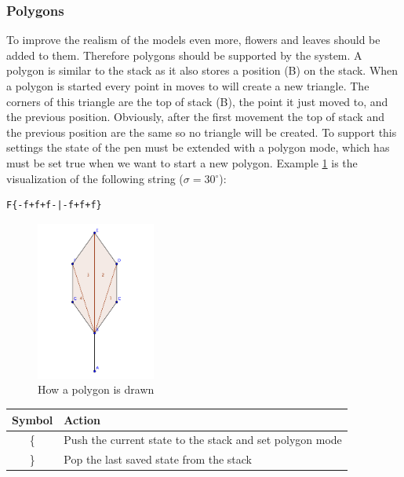\documentclass[11pt,a4paper]{article}
\newcommand{\degree}{\ensuremath{^\circ}}
\begin{document}
\subsubsection{Polygons}
To improve the realism of the models even more, flowers and leaves should be added to them. Therefore polygons should be supported by the system. A polygon is similar to the stack as it also stores a position (B) on the stack. When a polygon is started every point in moves to will create a new triangle. The corners of this triangle are the top of stack (B), the point it just moved to, and the previous position. Obviously, after the first movement the top of stack and the previous position are the same so no triangle will be created. To support this settings the state of the pen must be extended with a polygon mode, which has must be set true when we want to start a new polygon. Example \ref{fig:polygon} is the visualization of the following string ($\sigma = 30\degree$):
\begin{verbatim}
F{-f+f+f-|-f+f+f}
\end{verbatim}


\begin{figure}[h!]
  \centering
  \includegraphics[width=0.35\textwidth]{polygons.pdf}
  \caption{How a polygon is drawn}
  \label{fig:polygon}
\end{figure}

\begin{center}
\begin{tabular}{c | l}
Symbol & Action \\ \hline
\{ & Push the current state to the stack and set polygon mode \\
\} & Pop the last saved state from the stack \\
\end{tabular}
\end{center}

\end{document}
